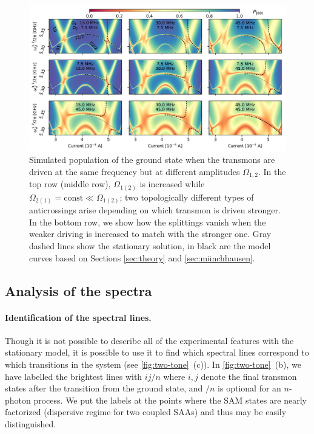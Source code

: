 \documentclass[%
 pra,
 amsmath,amssymb,
 reprint,%
]{revtex4-1}
\begin{document}
\begin{figure}
	\centering
	\includegraphics[width=\linewidth]{topological_splittings}
	\caption{Simulated population of the ground state when the transmons are driven at the same frequency but at different amplitudes $\Omega_{1,2}$. In the top row (middle row), $\Omega_{1(2)}$ is increased while $\Omega_{2(1)} = \text{const} \ll \Omega_{1(2)}$; two topologically different types of anticrossings arise depending on which transmon is driven stronger. In the bottom row, we show how the splittings vanish when the weaker driving is increased to match with the stronger one. Gray dashed lines show the stationary solution, in black are the model curves based on Sections \ref{sec:theory} and \ref{sec:münchhausen}.}
	\label{fig:difdrive}
\end{figure}


\subsection{Analysis of the spectra}

\paragraph{Identification of the spectral lines.} Though it is not possible to describe all of the experimental features with the stationary model, it is possible to use it to find which spectral lines correspond to which transitions in the system (see \autoref{fig:two-tone}~(c)). In \autoref{fig:two-tone}~(b), we have labelled the brightest lines with $ij/n$ where $i,j$ denote the final transmon states after the transition from the ground state, and $/n$ is optional for an $n$-photon process. We put the labels at the points where the SAM states are nearly factorized (dispersive regime for two coupled SAAs) and thus may be easily distinguished.
\end{document}
